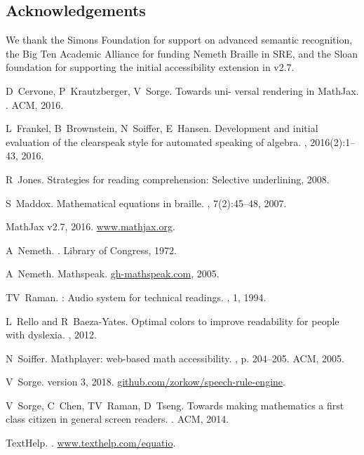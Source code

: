 \documentclass{sig-alternate}
\begin{document}
\subsection*{Acknowledgements}
We thank the Simons Foundation for support on advanced semantic recognition, the
Big Ten Academic Alliance for funding Nemeth Braille in SRE, and the
Sloan foundation for supporting the initial accessibility extension in v2.7.

% 
% 
\renewcommand{\baselinestretch}{.98}
\begin{thebibliography}{10}

D~Cervone, P~Krautzberger, V~Sorge.
\newblock Towards uni- versal rendering in MathJax.
. ACM, 2016.

L~Frankel, B~Brownstein, N~Soiffer, E~Hansen.
\newblock Development and initial evaluation of the clearspeak style for
  automated speaking of algebra.
, 2016(2):1--43, 2016.

R~Jones.
\newblock Strategies for reading comprehension: Selective underlining, 2008.

S~Maddox.
\newblock Mathematical equations in braille.
, 7(2):45--48, 2007.

{MathJax} v2.7, 2016.
\newblock \url{www.mathjax.org}.

A~Nemeth.
.
\newblock Library of Congress, 1972.

A~Nemeth.
\newblock Mathspeak.
\newblock \url{gh-mathspeak.com}, 2005.

TV~Raman.
: Audio system for technical readings.
, 1, 1994.

L~Rello and R~Baeza-Yates.
\newblock Optimal colors to improve readability for people with dyslexia.
, 2012.

N~Soiffer.
\newblock Mathplayer: web-based math accessibility.
, p. 204--205. ACM, 2005.

V~Sorge.
 version 3, 2018.
\newblock \url{github.com/zorkow/speech-rule-engine}.

V~Sorge, C~Chen, TV~Raman, D~Tseng.
\newblock Towards making mathematics a first class citizen in general screen
  readers.
. ACM, 2014.

TextHelp.
.
\newblock \url{www.texthelp.com/equatio}.

\end{thebibliography}
\end{document}
